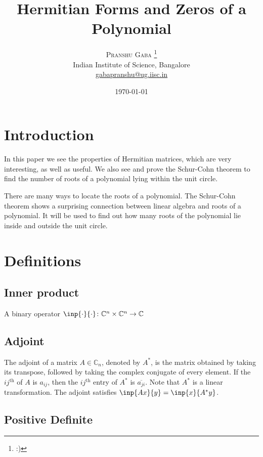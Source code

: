 \documentclass[twofold]{article}
\author{%
\textsc{Pranshu Gaba} \thanks{:)} \\[1ex]
\normalsize Indian Institute of Science, Bangalore \\
\normalsize \href{mailto:gabapranshu@iisc.ac.in}{gabapranshu@ug.iisc.in}}
\title{Hermitian Forms and Zeros of a Polynomial}
\date{\today}
\newcommand*\conj[1]{\overline{#1}}
\newcommand*\adj[1]{#1^*}
\theoremstyle{plain}
\theoremstyle{definition}
\begin{document}
\maketitle

\section{Introduction}




In this paper we see the properties of Hermitian matrices, which are very interesting, as well as useful. We also see and prove the Schur-Cohn theorem to find the number of roots of a polynomial lying within the unit circle. 

There are many ways to locate the roots of a polynomial. The Schur-Cohn theorem shows a surprising connection between linear algebra and roots of a polynomial. It will be used to find out how many roots of the polynomial lie inside and outside the unit circle.


\section{Definitions}


\subsection{Inner product}

A binary operator \(\inp{\cdot}{\cdot} \colon \mathbb{C}^n \times \mathbb{C}^n \to \mathbb{C}\)


\subsection{Adjoint}

The adjoint of a matrix \(A \in \mathbb{C}_n\), denoted by \(\adj{A}\), is the matrix obtained by taking its transpose, followed by taking the complex conjugate of every element. If the \(ij^{\text{th}} \) of \(A\) is \(a_{ij}\), then the \(ij^{\text{th}}\) entry of \(\adj{A}\) is \(\conj{a_{ji}}\). Note that \(\adj{A}\) is a linear transformation. The adjoint satisfies \(\inp{Ax}{y} = \inp{x}{\adj{A}y}\). 


\subsection{Positive Definite}
\end{document}
